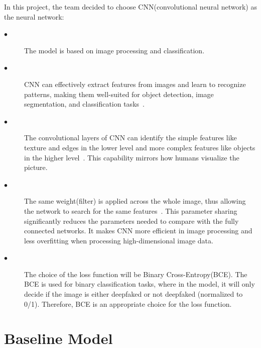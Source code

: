 \documentclass{article} %
\begin{document}
In this project, the team decided to choose CNN(convolutional neural network) as the neural network:
\begin{description}
  \item[$\bullet$ ] The model is based on image processing and classification. 
  \item[$\bullet$ ] CNN can effectively extract features from images and learn to recognize patterns, making them well-suited for object detection, image segmentation, and classification tasks~\citep{Tripathi_2023}.
  \item[$\bullet$ ] The convolutional layers of CNN can identify the simple features like texture and edges in the lower level and more complex features like objects in the higher level~\citep{Yamashita_2018}. This capability mirrors how humans visualize the picture.
  \item[$\bullet$ ] The same weight(filter) is applied across the whole image, thus allowing the network to search for the same features~\citep{Yamashita_2018}. This parameter sharing significantly reduces the parameters needed to compare with the fully connected networks. It makes CNN more efficient in image processing and less overfitting when processing high-dimensional image data.
  \item[$\bullet$ ] The choice of the loss function will be Binary Cross-Entropy(BCE). The BCE is used for binary classification tasks, where in the model, it will only decide if the image is either deepfaked or not deepfaked (normalized to 0/1). Therefore, BCE is an appropriate choice for the loss function.
\end{description}

\section{Baseline Model}
\end{document}
